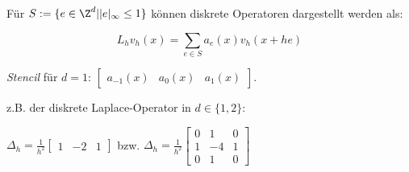 Für $S := \{ e \in \Z^d | |e|_\infty \leq 1 \}$ können diskrete Operatoren dargestellt werden als:

$$L_h v_h(x) = \sum_{e \in S} a_e(x) v_h(x+he)$$

\emph{Stencil} für $d=1$: $\begin{bmatrix} a_{-1}(x) & a_0(x) & a_1(x) \end{bmatrix}$.

z.B. der diskrete Laplace-Operator in $d \in \{ 1, 2 \}$:

$\Delta_h = \frac{1}{h^2} \begin{bmatrix} 1 & -2 & 1 \end{bmatrix}$ bzw. $\Delta_h = \frac{1}{h^2} \begin{bmatrix} 0 & 1 & 0 \\ 1 & -4 & 1 \\ 0 & 1 & 0 \end{bmatrix}$
